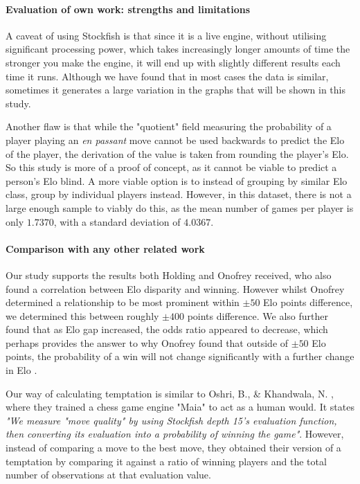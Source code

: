 \documentclass[10pt,a4paper]{article}
\begin{document}
\begin{multicols}{2}
\paragraph{Evaluation of own work: strengths and limitations}
A caveat of using Stockfish is that since it is a live engine, without utilising significant processing power, which takes increasingly longer amounts of time the stronger you make the engine, it will end up with slightly different results each time it runs. Although we have found that in most cases the data is similar, sometimes it generates a large variation in the graphs that will be shown in this study.\newline

Another flaw is that while the "quotient"  field measuring the probability of a player playing an \textit{en passant} move cannot be used backwards to predict the Elo of the player, the derivation of the value is taken from rounding the player's Elo. So this study is more of a proof of concept, as it cannot be viable to predict a person's Elo blind. A more viable option is to instead of grouping by similar Elo class, group by individual players instead. However, in this dataset, there is not a large enough sample to viably do this, as the mean number of games per player is only $1.7370$, with a standard deviation of $4.0367$.


\paragraph{Comparison with any other related work}
Our study supports the results both Holding \cite{PsychologyOfChessSkill} and Onofrey \cite{HowMuchDoesEloMatter} received, who also found a correlation between Elo disparity and winning. However whilst Onofrey \cite{HowMuchDoesEloMatter} determined a relationship to be most prominent within $\pm 50$ Elo points difference, we determined this between roughly $\pm 400$ points difference. We also further found that as Elo gap increased, the odds ratio appeared to decrease, which perhaps provides the answer to why Onofrey found that outside of $\pm 50$ Elo points, the
probability of a win will not change significantly with a further change in Elo \cite{HowMuchDoesEloMatter}. \newline

Our way of calculating temptation is similar to Oshri, B., \& Khandwala, N. \cite{mcilroy2022learning}, where they trained a chess game engine "Maia" to act as a human would. It states \textit{"We measure "move quality" by using Stockfish depth 15's evaluation function, then converting its evaluation into a probability of winning the game"}. However, instead of comparing a move to the best move, they obtained their version of a temptation by comparing it against a ratio of winning players and the total number of observations at that evaluation value.




\end{multicols}
\end{document}
